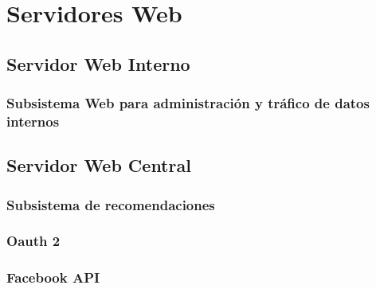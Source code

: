 \section{Servidores Web}

\subsection{Servidor Web Interno}

\subsubsection{Subsistema Web para administración y tráfico de datos internos}

\subsection{Servidor Web Central}

\subsubsection{Subsistema de recomendaciones}

\subsubsection{Oauth 2}

\subsubsection{Facebook API}